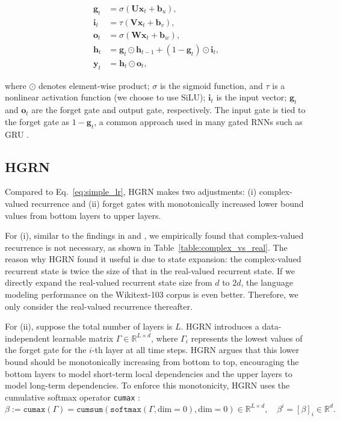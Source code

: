 \begin{equation}
\begin{aligned}
\mathbf{g}_t & = \sigma\left(\mathbf{U} \mathbf{x}_t + \mathbf{b}_u\right), \\
\mathbf{i}_t & = \tau\left(\mathbf{V} \mathbf{x}_t + \mathbf{b}_v\right), \\
\mathbf{o}_t & = \sigma\left(\mathbf{W} \mathbf{x}_t + \mathbf{b}_w\right), \\
\mathbf{h}_t & = \mathbf{g}_t \odot \mathbf{h}_{t-1} + \left(1 - \mathbf{g}_t\right) \odot \mathbf{i}_t, \\
\mathbf{y}_t & = \mathbf{h}_t \odot \mathbf{o}_t,
\end{aligned}
\label{eq:simple_lr}
\end{equation}

where \(\odot\) denotes element-wise product; \(\sigma\) is the sigmoid function, and \(\tau\) is a nonlinear activation function (we choose to use \(\mathrm{SiLU}\)); \(\mathbf{i}_t\) is the input vector; \(\mathbf{g}_t\) and \(\mathbf{o}_t\) are the forget gate and output gate, respectively. The input gate is tied to the forget gate as \(1 - \mathbf{g}_t\), a common approach used in many gated RNNs such as GRU \citep{DBLP:journals/corr/ChungGCB14}.
\subsection{HGRN \citep{HGRN}}

Compared to Eq.~\ref{eq:simple_lr}, HGRN makes two adjustments: (i) complex-valued recurrence and (ii) forget gates with monotonically increased lower bound values from bottom layers to upper layers.

For (i), similar to the findings in \cite{Gu2023MambaLS} and \cite{Griffin}, we empirically found that complex-valued recurrence is not necessary, as shown in Table~\ref{table:complex_vs_real}. The reason why HGRN found it useful is due to state expansion: the complex-valued recurrent state is twice the size of that in the real-valued recurrent state. If we directly expand the real-valued recurrent state size from \(d\) to \(2d\), the language modeling performance on the Wikitext-103 corpus is even better. Therefore, we only consider the real-valued recurrence thereafter.

For (ii), suppose the total number of layers is \(L\). HGRN introduces a data-independent learnable matrix \(\Gamma \in \mathbb{R}^{L \times d}\), where \(\Gamma_i\) represents the lowest values of the forget gate for the \(i\)-th layer at all time steps. HGRN argues that this lower bound should be monotonically increasing from bottom to top, encouraging the bottom layers to model short-term local dependencies and the upper layers to model long-term dependencies. To enforce this monotonicity, HGRN uses the cumulative softmax operator \texttt{cumax} \citep{Shen2018OrderedNI}:
\[
\beta := \texttt{cumax}(\Gamma) = \texttt{cumsum}(\texttt{softmax}(\Gamma, \text{dim}=0), \text{dim}=0) \in \mathbb{R}^{L \times d}, \quad \beta^{i} = [\beta]_i \in \mathbb{R}^d.
\]

